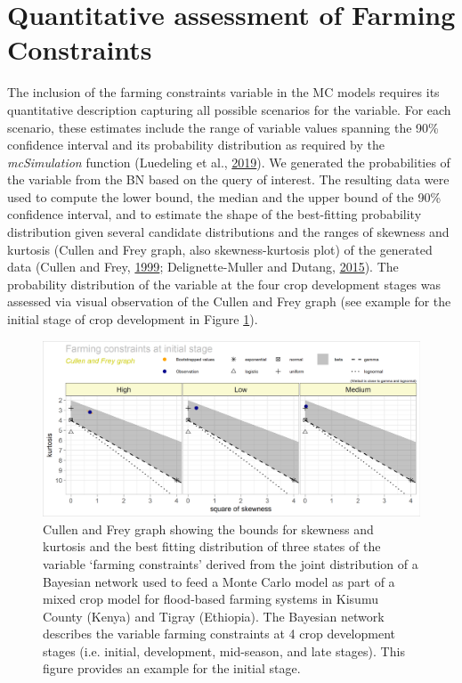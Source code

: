 \documentclass[]{elsarticle} %
\begin{document}
\hypertarget{refs3}{%
\section{Quantitative assessment of Farming Constraints}\label{refs3}}

The inclusion of the farming constraints variable in the MC models requires its quantitative description capturing all possible scenarios for the variable. For each scenario, these estimates include the range of variable values spanning the 90\% confidence interval and its probability distribution as required by the \emph{mcSimulation} function (Luedeling et al., \protect\hyperlink{ref-Luedeling_Goehring_et_al_2019}{2019}). We generated the probabilities of the variable from the BN based on the query of interest. The resulting data were used to compute the lower bound, the median and the upper bound of the 90\% confidence interval, and to estimate the shape of the best-fitting probability distribution given several candidate distributions and the ranges of skewness and kurtosis (Cullen and Frey graph, also skewness-kurtosis plot) of the generated data (Cullen and Frey, \protect\hyperlink{ref-Cullen_and_Frey_1999}{1999}; Delignette-Muller and Dutang, \protect\hyperlink{ref-Delignette-Muller_and_Dutang_2015}{2015}). The probability distribution of the variable at the four crop development stages was assessed via visual observation of the Cullen and Frey graph (see example for the initial stage of crop development in Figure \ref{fig:fig7}).

\begin{figure}[!h]

{\centering \includegraphics[width=1\linewidth,]{figures/figure_s7} 

}

\caption{Cullen and Frey graph showing the bounds for skewness and kurtosis and the best fitting distribution of three states of the variable ‘farming constraints’ derived from the joint distribution of a Bayesian network used to feed a Monte Carlo model as part of a mixed crop model for flood-based farming systems in Kisumu County (Kenya) and Tigray (Ethiopia). The Bayesian network describes the variable farming constraints at 4 crop development stages (i.e. initial, development, mid-season, and late stages). This figure provides an example for the initial stage.}\label{fig:fig7}
\end{figure}
\end{document}
